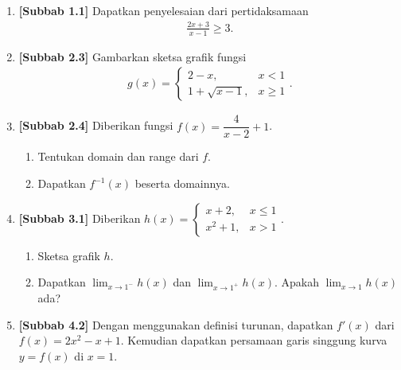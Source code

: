 \documentclass[10pt,openany,a4paper]{article}
\theoremstyle{definition}
\theoremstyle{definition}
\theoremstyle{plain}
\begin{document}
\begin{enumerate}
    \item \textbf{[Subbab 1.1]} Dapatkan penyelesaian dari pertidaksamaan
    \begin{align*}
        \frac{2x+3}{x-1}\geq 3.
    \end{align*}

    \item \textbf{[Subbab 2.3]} Gambarkan sketsa grafik fungsi
    \begin{align*}
        g(x)=\begin{cases}
            2-x, & x<1\\
            1+\sqrt{x-1}, & x\geq 1
        \end{cases}.
    \end{align*}

    \item \textbf{[Subbab 2.4]} Diberikan fungsi $f(x)=\dfrac{4}{x-2}+1$.
    \begin{enumerate}
        \item Tentukan domain dan range dari $f$.
        \item Dapatkan $f^{-1}(x)$ beserta domainnya.
    \end{enumerate}

    \item \textbf{[Subbab 3.1]} Diberikan $h(x)=\begin{cases}
        x+2, & x\leq 1\\
        x^2+1, & x>1
    \end{cases}$.
    \begin{enumerate}
        \item Sketsa grafik $h$.
        \item Dapatkan $\displaystyle\lim_{x\to 1^-}h(x)$ dan $\displaystyle\lim_{x\to 1^+}h(x)$. Apakah $\displaystyle\lim_{x\to 1}h(x)$ ada?
    \end{enumerate}

    \item \textbf{[Subbab 4.2]} Dengan menggunakan definisi turunan, dapatkan $f'(x)$ dari $f(x)=2x^2-x+1$. Kemudian dapatkan persamaan garis singgung kurva $y=f(x)$ di $x=1$.
\end{enumerate}
\end{document}
